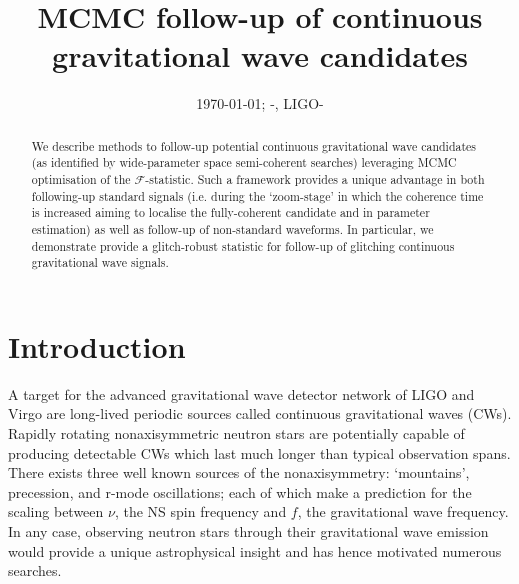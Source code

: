 \documentclass[aps, prd, twocolumn, superscriptaddress, floatfix, showpacs, nofootinbib, longbibliography]{revtex4-1}
\newcommand{\dcc}{LIGO-{\color{red}}}
\begin{document}
\title{MCMC follow-up of continuous gravitational wave candidates}


\date{\today}

\begin{abstract}

We describe methods to follow-up potential continuous gravitational wave
candidates (as identified by wide-parameter space semi-coherent searches)
leveraging MCMC optimisation of the $\mathcal{F}$-statistic.  Such a framework
provides a unique advantage in both following-up standard signals (i.e. during
the `zoom-stage' in which the coherence time is increased aiming to localise
the fully-coherent candidate and in parameter estimation) as well as follow-up
of non-standard waveforms. In particular, we demonstrate provide a
glitch-robust statistic for follow-up of glitching continuous gravitational
wave signals.

\end{abstract}


\date{\commitDATE; \commitIDshort-\commitSTATUS, \dcc}

\maketitle


\section{Introduction}

A target for the advanced gravitational wave detector network of LIGO
and Virgo are long-lived periodic sources called continuous gravitational waves (CWs).
Rapidly rotating nonaxisymmetric neutron stars are potentially capable of
producing detectable CWs which last much longer than typical observation spans.
There exists three well known sources of the nonaxisymmetry: `mountains',
precession, and r-mode oscillations; each of which make a prediction for the
scaling between $\nu$, the NS spin frequency and $f$, the gravitational wave
frequency. In any case, observing neutron stars through their gravitational
wave emission would provide a unique astrophysical insight and has hence
motivated numerous searches.
\end{document}

